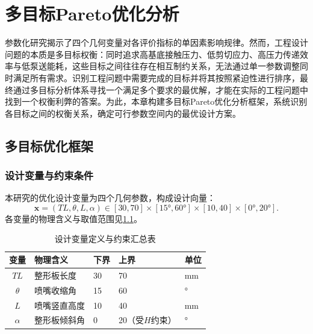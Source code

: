 \chapter{多目标Pareto优化分析}\label{chap:optimization}

参数化研究揭示了四个几何变量对各评价指标的单因素影响规律。然而，工程设计问题的本质是多目标权衡：同时追求高基底接触压力、低剪切应力、高压力传递效率与低泵送能耗，这些目标之间往往存在相互制约关系，无法通过单一参数调整同时满足所有需求。识别工程问题中需要完成的目标并将其按照紧迫性进行排序，最终通过多目标分析体系寻找一个满足多个要求的最优解，才能在实际的工程问题中找到一个权衡利弊的答案。为此，本章构建多目标Pareto优化分析框架，系统识别各目标之间的权衡关系，确定可行参数空间内的最优设计方案。

\section{多目标优化框架}

\subsection{设计变量与约束条件}

本研究的优化设计变量为四个几何参数，构成设计向量：
\begin{equation}\label{eq:design-vector}
  \mathbf{x} = (TL, \theta, L, \alpha) \in [30, 70] \times [15°, 60°] \times [10, 40] \times [0°, 20°].
\end{equation}
各变量的物理含义与取值范围见\cref{tab:5.1}。

\begin{table}[!htb]
  \centering
  \caption{设计变量定义与约束汇总表}\label{tab:5.1}
  \renewcommand{\arraystretch}{1.3}
  \begin{tabular}{cllll}
    \toprule
    \textbf{变量} & \textbf{物理含义} & \textbf{下界} & \textbf{上界} & \textbf{单位} \\
    \midrule
    $TL$     & 整形板长度    & 30 & 70           & mm \\
    $\theta$ & 喷嘴收缩角    & 15 & 60           & ° \\
    $L$      & 喷嘴竖直高度  & 10 & 40           & mm \\
    $\alpha$ & 整形板倾斜角  & 0  & 20（受$H$约束） & ° \\
    \bottomrule
  \end{tabular}
\end{table}

